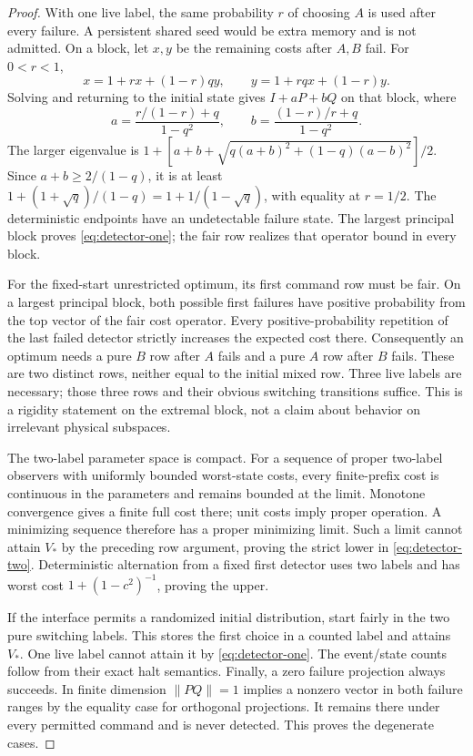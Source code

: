 \begin{proof}
With one live label, the same probability $r$ of choosing $A$ is used after every failure. A persistent shared seed would be extra memory and is not admitted. On a block, let $x,y$ be the remaining costs after $A,B$ fail. For $0<r<1$,
\[
 x=1+rx+(1-r)qy,\qquad y=1+rqx+(1-r)y.
\]
Solving and returning to the initial state gives $I+aP+bQ$ on that block, where
\[
 a=\frac{r/(1-r)+q}{1-q^2},\qquad
 b=\frac{(1-r)/r+q}{1-q^2}.
\]
The larger eigenvalue is $1+[a+b+\sqrt{q(a+b)^2+(1-q)(a-b)^2}]/2$. Since $a+b\ge2/(1-q)$, it is at least $1+(1+\sqrt q)/(1-q)=1+1/(1-\sqrt q)$, with equality at $r=1/2$. The deterministic endpoints have an undetectable failure state. The largest principal block proves \eqref{eq:detector-one}; the fair row realizes that operator bound in every block.

For the fixed-start unrestricted optimum, its first command row must be fair. On a largest principal block, both possible first failures have positive probability from the top vector of the fair cost operator. Every positive-probability repetition of the last failed detector strictly increases the expected cost there. Consequently an optimum needs a pure $B$ row after $A$ fails and a pure $A$ row after $B$ fails. These are two distinct rows, neither equal to the initial mixed row. Three live labels are necessary; those three rows and their obvious switching transitions suffice. This is a rigidity statement on the extremal block, not a claim about behavior on irrelevant physical subspaces.

The two-label parameter space is compact. For a sequence of proper two-label observers with uniformly bounded worst-state costs, every finite-prefix cost is continuous in the parameters and remains bounded at the limit. Monotone convergence gives a finite full cost there; unit costs imply proper operation. A minimizing sequence therefore has a proper minimizing limit. Such a limit cannot attain $V_*$ by the preceding row argument, proving the strict lower in \eqref{eq:detector-two}. Deterministic alternation from a fixed first detector uses two labels and has worst cost $1+(1-c^2)^{-1}$, proving the upper.

If the interface permits a randomized initial distribution, start fairly in the two pure switching labels. This stores the first choice in a counted label and attains $V_*$. One live label cannot attain it by \eqref{eq:detector-one}. The event/state counts follow from their exact halt semantics. Finally, a zero failure projection always succeeds. In finite dimension $\|PQ\|=1$ implies a nonzero vector in both failure ranges by the equality case for orthogonal projections. It remains there under every permitted command and is never detected. This proves the degenerate cases.
\end{proof}

